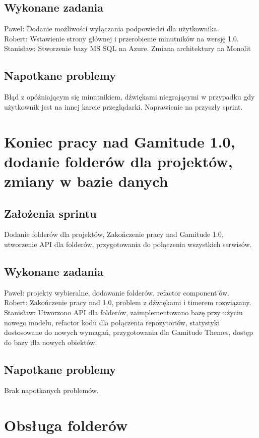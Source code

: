 \documentclass[a4paper,11pt]{report}
\begin{document}
\subsection {Wykonane zadania}
Paweł: Dodanie możliwości wyłączania podpowiedzi dla użytkownika.\\ 
Robert: Wstawienie strony głównej i przerobienie minutników na wersję 1.0. \\
Stanisław: Stworzenie bazy MS SQL na Azure. Zmiana architektury na Monolit \\
\subsection {Napotkane problemy}
Błąd z opóźniającym się minutnikiem, dźwiękami niegrającymi w przypadku gdy użytkownik jest na innej karcie przeglądarki. Naprawienie na przyszły sprint.

\section {Koniec pracy nad Gamitude 1.0, dodanie folderów dla projektów, zmiany w bazie danych}
\subsection {Założenia sprintu}
Dodanie folderów dla projektów, Zakończenie pracy nad Gamitude 1.0, utworzenie API dla folderów, przygotowania do połączenia wszystkich serwisów.
\subsection {Wykonane zadania}
Paweł: projekty wybieralne, dodawanie folderów, refactor component'ów.\\ 
Robert: Zakończenie pracy nad 1.0, problem z dźwiękami i timerem rozwiązany.\\
Stanisław: Utworzono API dla folderów, zaimplementowano bazę przy użyciu nowego modelu, refactor kodu dla połączenia repozytoriów, statystyki dostosowane do nowych wymagań, przygotowania dla Gamitude Themes, dostęp do bazy dla nowych obiektów. \\
\subsection {Napotkane problemy}
Brak napotkanych problemów.

\section {Obsługa folderów}
\label{sec:system_zarzadzania_folderami_uzytkownikow}
\end{document}
